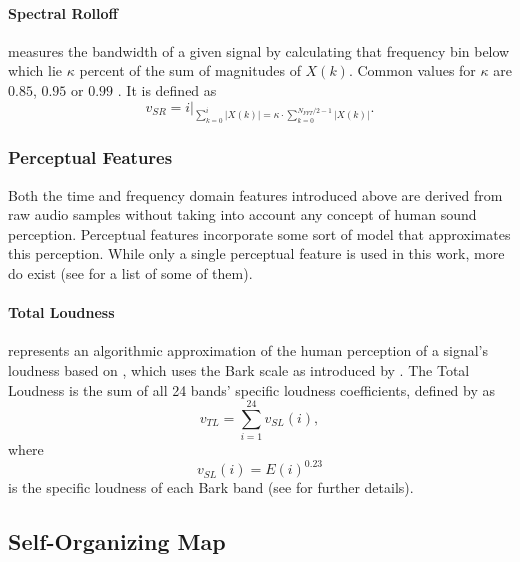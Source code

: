 \paragraph{Spectral Rolloff}
\label{para:rolloff}
measures the bandwidth of a given signal by calculating that frequency bin
below which lie $\kappa$ percent of the sum of magnitudes of $X(k)$. Common
values for $\kappa$ are $0.85$, $0.95$ \citep{lerch2012} or $0.99$
\citep{web:meyda2019_features}. It is defined as
\begin{equation}
  v_{SR} = i \Bigg\rvert_{ \sum\limits_{k=0}^{i} |X(k)| = \kappa
  \cdot{ \sum\limits_{k=0}^{N_{FFT}/2-1} |X(k)| } }.
\end{equation}

\subsubsection{Perceptual Features}
\label{perceptual_features}
Both the time and frequency domain features introduced above are derived from
raw audio samples without taking into account any concept of human sound
perception. Perceptual features incorporate some sort of model that approximates
this perception. While only a single perceptual feature is used in this work,
more do exist (see \citet{peeters2004} for a list of some of them).

\paragraph{Total Loudness}
\label{para:loudness}
represents an algorithmic approximation of the human perception of a signal's
loudness based on \citet{moore1997}, which uses the Bark scale as introduced by
\citet{zwicker1961}. The Total Loudness is the sum of all 24 bands' specific
loudness
coefficients, defined by \citet{peeters2004} as
\begin{equation}
  v_{TL} = \sum\limits_{i=1}^{24} v_{SL}(i),
\end{equation}
where
\begin{equation}
  v_{SL}(i) = E(i)^{0.23}
\end{equation}
is the specific loudness of each Bark band (see \citet{moore1997} for further
details).

\subsection{Self-Organizing Map}
\label{subsec:som}

